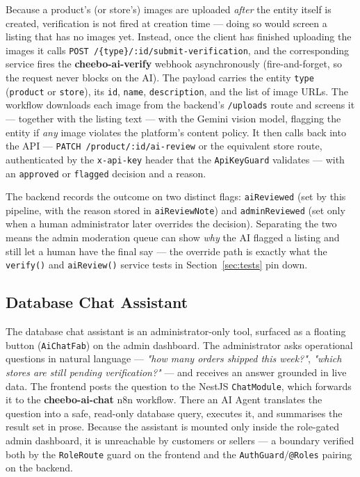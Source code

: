 \documentclass[12pt, a4paper, oneside]{report}
\begin{document}
Because a product's (or store's) images are uploaded \emph{after}
the entity itself is created, verification is not fired at creation
time --- doing so would screen a listing that has no images yet.
Instead, once the client has finished uploading the images it calls
\texttt{POST /\{type\}/:id/submit-verification}, and the
corresponding service fires the \textbf{cheebo-ai-verify} webhook
asynchronously (fire-and-forget, so the request never blocks on the
AI). The payload carries the entity \texttt{type} (\texttt{product}
or \texttt{store}), its \texttt{id}, \texttt{name},
\texttt{description}, and the list of image URLs. The workflow
downloads each image from the backend's \texttt{/uploads} route and
screens it --- together with the listing text --- with the Gemini
vision model, flagging the entity if \emph{any} image violates the
platform's content policy. It then calls back into the API ---
\texttt{PATCH /product/:id/ai-review} or the equivalent store route,
authenticated by the \texttt{x-api-key} header that the
\texttt{ApiKeyGuard} validates --- with an \texttt{approved} or
\texttt{flagged} decision and a reason.

The backend records the outcome on two distinct flags:
\texttt{aiReviewed} (set by this pipeline, with the reason stored in
\texttt{aiReviewNote}) and \texttt{adminReviewed} (set only when a
human administrator later overrides the decision). Separating the two
means the admin moderation queue can show \emph{why} the AI flagged a
listing and still let a human have the final say --- the override
path is exactly what the \texttt{verify()} and \texttt{aiReview()}
service tests in Section~\ref{sec:tests} pin down.

\subsection{Database Chat Assistant}

The database chat assistant is an administrator-only tool, surfaced as
a floating button (\texttt{AiChatFab}) on the admin dashboard. The
administrator asks operational questions in natural language ---
\textit{"how many orders shipped this week?"}, \textit{"which stores
are still pending verification?"} --- and receives an answer grounded
in live data. The frontend posts the question to the NestJS
\texttt{ChatModule}, which forwards it to the \textbf{cheebo-ai-chat}
n8n workflow. There an AI Agent translates the question into a safe,
read-only database query, executes it, and summarises the result set
in prose. Because the assistant is mounted only inside the
role-gated admin dashboard, it is unreachable by customers or
sellers --- a boundary verified both by the \texttt{RoleRoute} guard
on the frontend and the \texttt{AuthGuard}/\texttt{@Roles} pairing on
the backend.
\end{document}
